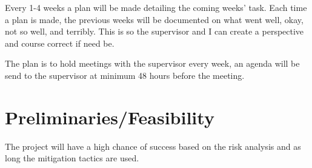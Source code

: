 \documentclass[a4paper,8pt]{article}
\newcommand{\phaseSetup}{Setup}
\newcommand{\phasey}{Evaluation}
\newcommand{\phaseu}{Conclusion}
\begin{document}
\begin{center}
	\end{center}
	Every 1-4 weeks a plan will be made detailing the coming weeks' task. Each time a plan is made, the previous weeks will be documented on what went well, okay, not so well, and terribly. This is so the supervisor and I can create a perspective and course correct if need be.
	
	The plan is to hold meetings with the supervisor every week, an agenda will be send to the supervisor at minimum 48 hours before the meeting.

	
	\section{Preliminaries/Feasibility}
		The project will have a high chance of success based on the risk analysis and as long the mitigation tactics are used.
	
\end{document}

